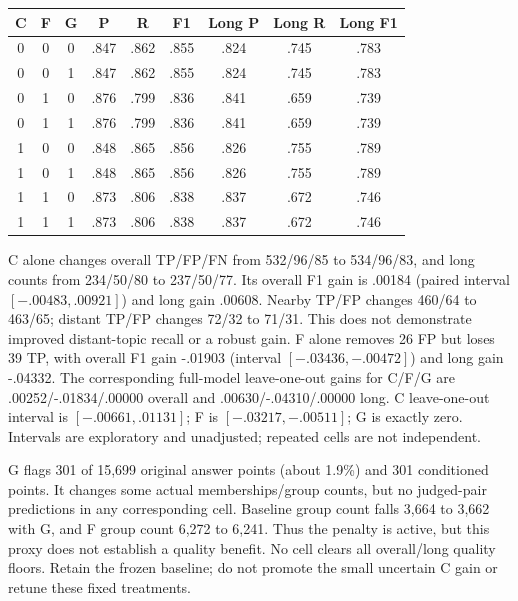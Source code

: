 \documentclass[11pt]{article}
\begin{document}
\begin{center}
\begin{tabular}{ccc|ccc|ccc}
\toprule
C & F & G & P & R & F1 & Long P & Long R & Long F1\\
\midrule
0 & 0 & 0 & .847 & .862 & .855 & .824 & .745 & .783\\
0 & 0 & 1 & .847 & .862 & .855 & .824 & .745 & .783\\
0 & 1 & 0 & .876 & .799 & .836 & .841 & .659 & .739\\
0 & 1 & 1 & .876 & .799 & .836 & .841 & .659 & .739\\
1 & 0 & 0 & .848 & .865 & .856 & .826 & .755 & .789\\
1 & 0 & 1 & .848 & .865 & .856 & .826 & .755 & .789\\
1 & 1 & 0 & .873 & .806 & .838 & .837 & .672 & .746\\
1 & 1 & 1 & .873 & .806 & .838 & .837 & .672 & .746\\
\bottomrule
\end{tabular}
\end{center}

C alone changes overall TP/FP/FN from 532/96/85 to 534/96/83, and long counts
from 234/50/80 to 237/50/77. Its overall F1 gain is .00184 (paired interval
$[-.00483,.00921]$) and long gain .00608. Nearby TP/FP changes 460/64 to 463/65;
distant TP/FP changes 72/32 to 71/31. This does not demonstrate improved
distant-topic recall or a robust gain. F alone removes 26 FP but loses 39 TP,
with overall F1 gain -.01903 (interval $[-.03436,-.00472]$) and long gain -.04332.
The corresponding full-model leave-one-out gains for C/F/G are
.00252/-.01834/.00000 overall and .00630/-.04310/.00000 long. C leave-one-out
interval is $[-.00661,.01131]$; F is $[-.03217,-.00511]$; G is exactly zero.
Intervals are exploratory and unadjusted; repeated cells are not independent.

G flags 301 of 15,699 original answer points (about 1.9\%) and 301 conditioned
points. It changes some actual memberships/group counts, but no judged-pair
predictions in any corresponding cell. Baseline group count falls 3,664 to
3,662 with G, and F group count 6,272 to 6,241. Thus the penalty is active,
but this proxy does not establish a quality benefit. No cell clears all
overall/long quality floors. Retain the frozen baseline; do not promote the
small uncertain C gain or retune these fixed treatments.
\end{document}
